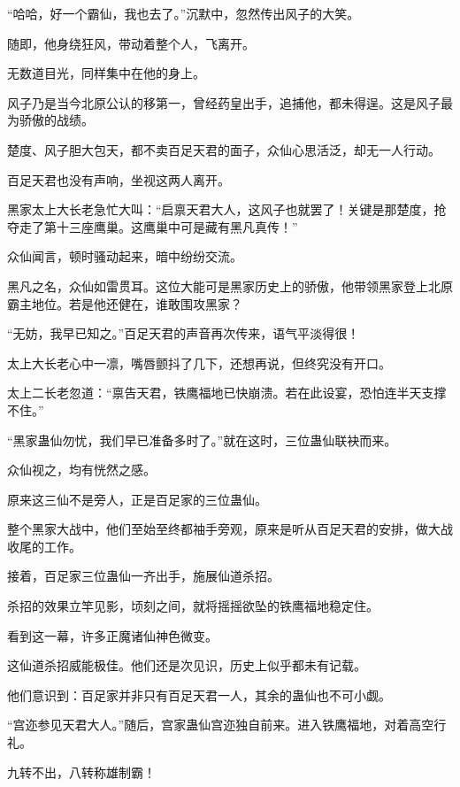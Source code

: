 
\begin{this_body}



“哈哈，好一个霸仙，我也去了。”沉默中，忽然传出风子的大笑。

随即，他身绕狂风，带动着整个人，飞离开。

无数道目光，同样集中在他的身上。

风子乃是当今北原公认的移第一，曾经药皇出手，追捕他，都未得逞。这是风子最为骄傲的战绩。

楚度、风子胆大包天，都不卖百足天君的面子，众仙心思活泛，却无一人行动。

百足天君也没有声响，坐视这两人离开。

黑家太上大长老急忙大叫：“启禀天君大人，这风子也就罢了！关键是那楚度，抢夺走了第十三座鹰巢。这鹰巢中可是藏有黑凡真传！”

众仙闻言，顿时骚动起来，暗中纷纷交流。

黑凡之名，众仙如雷贯耳。这位大能可是黑家历史上的骄傲，他带领黑家登上北原霸主地位。若是他还健在，谁敢围攻黑家？

“无妨，我早已知之。”百足天君的声音再次传来，语气平淡得很！

太上大长老心中一凛，嘴唇颤抖了几下，还想再说，但终究没有开口。

太上二长老忽道：“禀告天君，铁鹰福地已快崩溃。若在此设宴，恐怕连半天支撑不住。”

“黑家蛊仙勿忧，我们早已准备多时了。”就在这时，三位蛊仙联袂而来。

众仙视之，均有恍然之感。

原来这三仙不是旁人，正是百足家的三位蛊仙。

整个黑家大战中，他们至始至终都袖手旁观，原来是听从百足天君的安排，做大战收尾的工作。

接着，百足家三位蛊仙一齐出手，施展仙道杀招。

杀招的效果立竿见影，顷刻之间，就将摇摇欲坠的铁鹰福地稳定住。

看到这一幕，许多正魔诸仙神色微变。

这仙道杀招威能极佳。他们还是次见识，历史上似乎都未有记载。

他们意识到：百足家并非只有百足天君一人，其余的蛊仙也不可小觑。

“宫迩参见天君大人。”随后，宫家蛊仙宫迩独自前来。进入铁鹰福地，对着高空行礼。

九转不出，八转称雄制霸！


\end{this_body}
